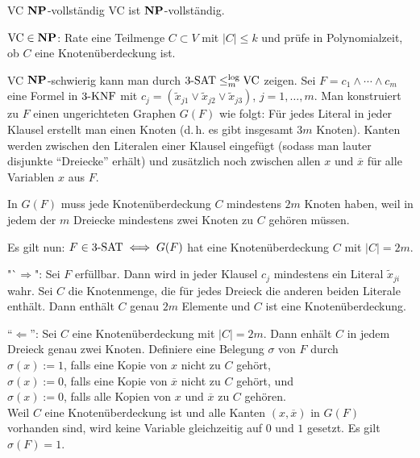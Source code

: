 \begin{Satz}{VC $\mathbf{NP}$-vollständig}
    VC ist $\mathbf{NP}$-vollständig.
\end{Satz}

\begin{Beweis}
    $\text{VC} \in \mathbf{NP}$:
    Rate eine Teilmenge $C \subset V$ mit $|C| \le k$ und prüfe in Polynomialzeit, ob $C$ eine
    Knotenüberdeckung ist.
    
    VC $\mathbf{NP}$-schwierig kann man durch $3\text{-SAT} \le_m^{\log} \text{VC}$ zeigen.
    Sei $F = c_1 \land \dotsb \land c_m$ eine Formel in $3\text{-}\text{KNF}$ mit
    $c_j = (\widetilde{x}_{j1} \lor \widetilde{x}_{j2} \lor \widetilde{x}_{j3})$,
    $j = 1, \dotsc, m$.
    Man konstruiert zu $F$ einen ungerichteten Graphen $G(F)$ wie folgt:
    Für jedes Literal in jeder Klausel erstellt man einen Knoten
    (d.\,h. es gibt insgesamt $3m$ Knoten).
    Kanten werden zwischen den Literalen einer Klausel eingefügt
    (sodass man lauter disjunkte "`Dreiecke"' erhält)
    und zusätzlich noch zwischen allen $x$ und $\overline{x}$ für alle Variablen $x$ aus $F$.
    
    In $G(F)$ muss jede Knotenüberdeckung $C$ mindestens $2m$ Knoten haben,
    weil in jedem der $m$ Dreiecke mindestens zwei Knoten zu $C$ gehören müssen.
    
    Es gilt nun: $F \in 3\text{-SAT} \iff G(F)$ hat eine Knotenüberdeckung $C$ mit $|C| = 2m$.
    
    "`$\Rightarrow$":
    Sei $F$ erfüllbar.
    Dann wird in jeder Klausel $c_j$ mindestens ein Literal $\widetilde{x}_{ji}$ wahr.
    Sei $C$ die Knotenmenge, die für jedes Dreieck die anderen beiden Literale enthält.
    Dann enthält $C$ genau $2m$ Elemente und $C$ ist eine Knotenüberdeckung.
    
    "`$\Leftarrow$"':
    Sei $C$ eine Knotenüberdeckung mit $|C| = 2m$.
    Dann enhält $C$ in jedem Dreieck genau zwei Knoten.
    Definiere eine Belegung $\sigma$ von $F$ durch\\
    $\sigma(x) := 1$, falls eine Kopie von $x$ nicht zu $C$ gehört,\\
    $\sigma(x) := 0$, falls eine Kopie von $\overline{x}$ nicht zu $C$ gehört, und\\
    $\sigma(x) := 0$, falls alle Kopien von $x$ und $\overline{x}$ zu $C$ gehören.\\
    Weil $C$ eine Knotenüberdeckung ist und alle Kanten $(x, \overline{x})$ in $G(F)$ vorhanden
    sind, wird keine Variable gleichzeitig auf $0$ und $1$ gesetzt.
    Es gilt $\sigma(F) = 1$.
\end{Beweis}

